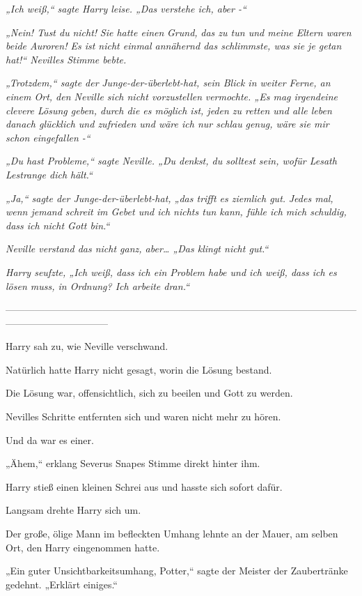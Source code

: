 {\emph{„Ich weiß,“ sagte Harry leise. „Das verstehe ich, aber -“}

\emph{„Nein! Tust du} \emph{\emph{nicht!}} \emph{Sie hatte einen} \emph{\emph{Grund}\emph{,}} \emph{das zu tun und meine Eltern waren beide Auroren! Es ist nicht einmal annähernd das schlimmste, was sie je getan hat!“ Nevilles Stimme bebte.}

\emph{„Trotzdem,“ sagte der} \emph{Junge-der-überlebt-hat, sein Blick in weiter Ferne, an einem Ort, den Neville sich nicht vorzustellen} \emph{vermochte. „Es mag irgendeine clevere Lösung geben, durch die es möglich ist, jeden zu retten und alle leben danach glücklich und zufrieden und wäre ich nur schlau} \emph{genug, wäre sie mir schon eingefallen -“}

\emph{„Du hast Probleme,“ sagte Neville. „Du denkst, du solltest sein, wofür Lesath Lestrange dich hält.“}

\emph{„Ja,“ sagte der Junge-der-überlebt-hat, „das trifft es ziemlich gut.} \emph{Jedes mal, wenn jemand schreit im Gebet und ich nichts tun kann, fühle ich mich schuldig, dass ich nicht Gott bin.“}

\emph{Neville verstand das nicht ganz, aber… „Das klingt nicht gut.“}

\emph{Harry seufzte, „Ich weiß, dass ich ein Problem habe und ich weiß, dass ich es lösen muss, in Ordnung? Ich arbeite dran.“}

--------------------------------------------------------------------------------------------------------------------------------------------

\hfill\break Harry sah zu, wie Neville verschwand.

Natürlich hatte Harry nicht gesagt, worin die Lösung bestand.

Die Lösung war, offensichtlich, sich zu beeilen und Gott zu werden.

Nevilles Schritte entfernten sich und waren nicht mehr zu hören.

Und da war es einer.

„Ähem,“ erklang Severus Snapes Stimme direkt hinter ihm.

Harry stieß einen kleinen Schrei aus und hasste sich sofort dafür.

Langsam drehte Harry sich um.

Der große, ölige Mann im befleckten Umhang lehnte an der Mauer, am selben Ort, den Harry eingenommen hatte.

„Ein guter Unsichtbarkeitsumhang, Potter,“ sagte der Meister der Zaubertränke gedehnt. „Erklärt einiges.“

}
